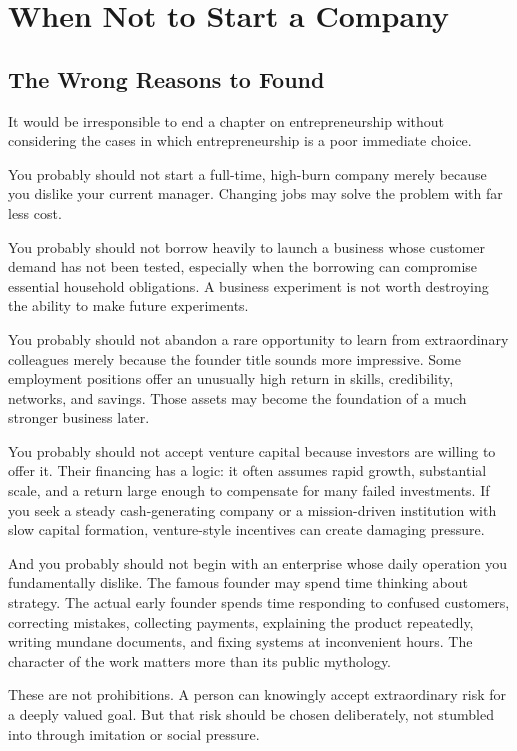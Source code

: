 \section{When Not to Start a Company}

\subsection{The Wrong Reasons to Found}

It would be irresponsible to end a chapter on entrepreneurship without considering the cases in which entrepreneurship is a poor immediate choice.

You probably should not start a full-time, high-burn company merely because you dislike your current manager. Changing jobs may solve the problem with far less cost.

You probably should not borrow heavily to launch a business whose customer demand has not been tested, especially when the borrowing can compromise essential household obligations. A business experiment is not worth destroying the ability to make future experiments.

You probably should not abandon a rare opportunity to learn from extraordinary colleagues merely because the founder title sounds more impressive. Some employment positions offer an unusually high return in skills, credibility, networks, and savings. Those assets may become the foundation of a much stronger business later.

You probably should not accept venture capital because investors are willing to offer it. Their financing has a logic: it often assumes rapid growth, substantial scale, and a return large enough to compensate for many failed investments. If you seek a steady cash-generating company or a mission-driven institution with slow capital formation, venture-style incentives can create damaging pressure.

And you probably should not begin with an enterprise whose daily operation you fundamentally dislike. The famous founder may spend time thinking about strategy. The actual early founder spends time responding to confused customers, correcting mistakes, collecting payments, explaining the product repeatedly, writing mundane documents, and fixing systems at inconvenient hours. The character of the work matters more than its public mythology.

These are not prohibitions. A person can knowingly accept extraordinary risk for a deeply valued goal. But that risk should be chosen deliberately, not stumbled into through imitation or social pressure.

